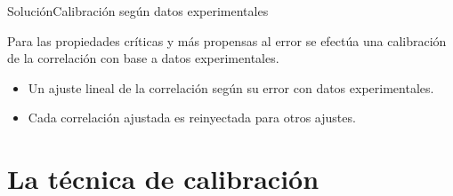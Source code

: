 \documentclass{beamer}
\begin{document}
 \begin{frame}{Solución}{Calibración según datos experimentales}

  Para las propiedades críticas y más propensas al error se efectúa una
  calibración de la correlación con base a datos experimentales.

  \begin{itemize}
   \item Un ajuste lineal de la correlación según su error con datos
	 experimentales.
	 
   \item Cada correlación ajustada es reinyectada para otros ajustes.
  \end{itemize}

 \end{frame}

\section{La técnica de calibración}
\end{document}
